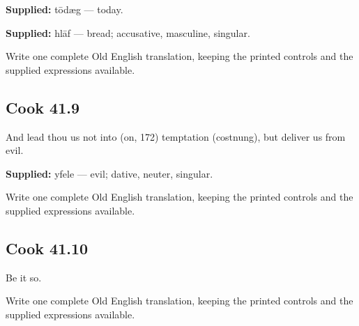 \textbf{Supplied:} tōdæg — today.

\textbf{Supplied:} hlāf — bread; accusative, masculine, singular.

Write one complete Old English translation, keeping the printed controls and the supplied expressions available.

\par\begin{minipage}{\linewidth}\raggedright
\subsection*{Cook 41.9}

And lead thou us not into (on, 172) temptation (costnung), but deliver us from evil.

\end{minipage}\par\addvspace{4pt}

\textbf{Supplied:} yfele — evil; dative, neuter, singular.

Write one complete Old English translation, keeping the printed controls and the supplied expressions available.

\par\begin{minipage}{\linewidth}\raggedright
\subsection*{Cook 41.10}

Be it so.

Write one complete Old English translation, keeping the printed controls and the supplied expressions available.

\end{minipage}\par\addvspace{4pt}

